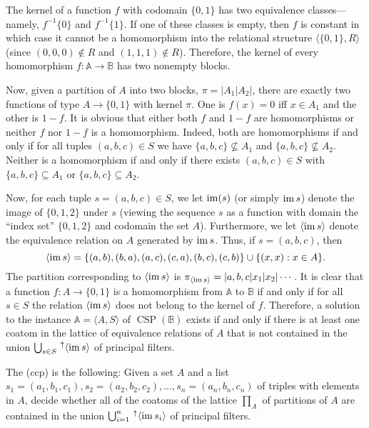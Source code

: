\documentclass[12pt]{amsart}
\numberwithin{equation}{section}
\theoremstyle{plain}
\theoremstyle{definition}
\newcommand{\ccp}{\acs{ccp}\xspace}
\begin{document}
The kernel of a function $f$ with codomain $\{0,1\}$ has two equivalence
classes---namely, $f^{-1}\{0\}$ and $f^{-1}\{1\}$.
If one of these classes is empty, then $f$ is constant 
in which case it cannot be a homomorphism into the relational structure
$\langle \{0, 1\}, R\rangle$ (since $(0,0,0)\notin R$ and $(1,1,1)\notin R$).
Therefore, the kernel of every homomorphism $f \colon \mathbb A \rightarrow \mathbb B$
has two nonempty blocks.

Now, given a partition of $A$ into two blocks, $\pi = |A_1|A_2|$,
there are exactly two functions of type $A \rightarrow \{0,1\}$
with kernel $\pi$. One is $f(x) = 0$ iff $x \in A_1$ and the other is $1-f$.
It is obvious that either both $f$ and $1-f$ are homomorphisms or neither $f$
nor $1-f$ is a homomorphism. Indeed, both are homomorphisms if and only if
for all tuples $(a,b,c) \in S$ we have $\{a,b,c\} \nsubseteq A_1$ and
$\{a,b,c\} \nsubseteq A_2$.
Neither is a homomorphism if and only if there exists
$(a,b,c) \in S$ with $\{a,b,c\} \subseteq A_1$ or
$\{a,b,c\} \subseteq A_2$.

Now, for each tuple $s = (a,b,c) \in S$, we let $\operatorname{im}(s)$ (or simply $\operatorname{im} s$)  denote the image of
$\{0,1,2\}$ under $s$ (viewing the sequence $s$ as a function with domain the 
``index set'' $\{0,1,2\}$ and codomain the set $A$).
Furthermore, we let $\langle \operatorname{im} s\rangle$ denote the equivalence relation on $A$
generated by $\operatorname{im} s$.  Thus, if $s = (a,b,c)$, then 
\[
\langle \operatorname{im} s \rangle = \{(a,b), (b,a), (a,c), (c,a), (b,c), (c,b)\} \cup \{(x,x) : x \in A\}.
\]
The partition corresponding to $\langle \operatorname{im} s \rangle$ is
$\pi_{\langle \operatorname{im} s\rangle} = |a, b, c|x_1|x_2|\cdots$.
It is clear that a function $f\colon A \rightarrow \{0, 1\}$ is a homomorphism from
$\mathbb A$ to $\mathbb B$ if and only if for all $s \in S$
the relation $\langle \operatorname{im} s\rangle$ does not belong to the kernel of $f$.
Therefore, a solution to the instance $\mathbb A = \langle A, S \rangle$ of
$\operatorname{CSP}(\mathbb B)$ exists if and only if there is at least one coatom
in the lattice of equivalence relations of $A$ that is not contained in the union
$ \bigcup_{s\in S} \, ^\uparrow\langle \operatorname{im} s \rangle $ of principal filters.

The  (\ccp) is the following:
Given a set $A$ and a list
$s_1 = (a_1, b_1, c_1), s_2=(a_2, b_2, c_2), \dots, s_n =(a_n, b_n, c_n)$
of triples with elements in $A$, decide whether all of the coatoms
of the lattice $\prod_A$ of partitions of $A$ are contained in the union
$ \bigcup_{i=1}^n \, ^\uparrow\langle \operatorname{im} s_i \rangle$ of principal filters.
\end{document}
